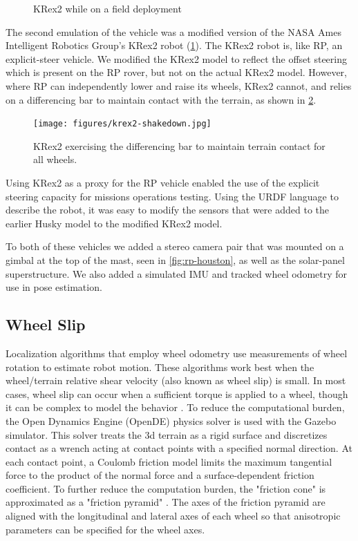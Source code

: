 \documentclass[twocolumn,letterpaper]{IEEEAerospaceCLS}  %
\begin{document}
\begin{figure}[htp]
\caption{KRex2 while on a field deployment \label{fig:krex2}}
\end{figure}

The second emulation of the vehicle was a modified version of the NASA Ames Intelligent Robotics Group's KRex2 robot (\cref{fig:krex2}).  
The KRex2 robot is, like RP, an explicit-steer vehicle.  
We modified the KRex2 model to reflect the offset steering which is present on the RP rover, but not on the actual KRex2 model.  
However, where RP can independently lower and raise its wheels, KRex2 cannot, and relies on a differencing bar to maintain contact with the terrain, as shown in \cref{fig:krex2-differencing}.    

\begin{figure}[htp]
\texttt{[image: figures/krex2-shakedown.jpg]}
\caption{KRex2 exercising the differencing bar to maintain terrain contact for all wheels. \label{fig:krex2-differencing}}
\end{figure}

Using KRex2 as a proxy for the RP vehicle enabled the use of the explicit steering capacity for missions operations testing.  
Using the URDF language to describe the robot, it was easy to modify the sensors that were added to the earlier Husky model to the modified KRex2 model.  


To both of these vehicles we added a stereo camera pair that was mounted on a gimbal at the top of the mast, seen in \cref{fig:rp-houston}, as well as the solar-panel superstructure. 
We also added a simulated IMU and tracked wheel odometry for use in pose estimation.  

\subsection{Wheel Slip}
Localization algorithms that employ wheel odometry use measurements of wheel rotation to estimate robot motion.
These algorithms work best when the wheel/terrain relative shear velocity (also known as wheel slip) is small.
In most cases, wheel slip can occur when a sufficient torque is applied to a wheel,
though it can be complex to model the behavior \cite{yoshida1013712}.
To reduce the computational burden, the Open Dynamics Engine (OpenDE) physics solver is used with the Gazebo simulator.
This solver treats the 3d terrain as a rigid surface and discretizes contact as a wrench
acting at contact points with a specified normal direction.
At each contact point, a Coulomb friction model limits the maximum tangential force
to the product of the normal force and a surface-dependent friction coefficient.
To further reduce the computation burden, the "friction cone" is approximated
as a "friction pyramid" \cite{hsuPeters2014}.
The axes of the friction pyramid are aligned with the longitudinal and lateral axes of each wheel
so that anisotropic parameters can be specified for the wheel axes.
\end{document}
